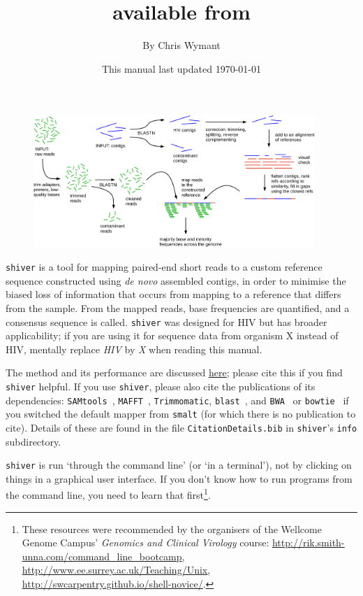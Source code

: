 \documentclass{article}
\title{\shiv\\available from \href{https://github.com/ChrisHIV/shiver}{\www{https://github.com/ChrisHIV/shiver}}}
\date{This manual last updated \today}
\author{By Chris Wymant}
\newcommand{\shiv}{\c{shiver}\xspace}
\let\c\texttt
\newcommand{\www}{\color{blue} \underline}
\begin{document}
\maketitle


\begin{figure}[!h]
\centering
\includegraphics[width=0.95\textwidth]{AssemblyPipelineDiagram_ForPaper.pdf}
\end{figure}


\shiv is a tool for mapping paired-end short reads to a custom reference sequence constructed using {\it de novo} assembled contigs, in order to minimise the biased loss of information that occurs from mapping to a reference that differs from the sample.
From the mapped reads, base frequencies are quantified, and a consensus sequence is called.
\shiv was designed for HIV but has broader applicability; if you are using it for sequence data from organism X instead of HIV, mentally replace {\it HIV} by {\it X} when reading this manual.

The method and its performance are discussed \href{https://doi.org/10.1093/ve/vey007}{\www{here}}; please cite this if you find \shiv helpful.
If you use \shiv, please also cite the publications of its dependencies: \c{SAMtools}~\cite{Li08062009}, \c{MAFFT}~\cite{Katoh15072002}, \c{Trimmomatic}\cite{Bolger01082014}, \c{blast}~\cite{ALTSCHUL1990403}, and \c{BWA}~\cite{doi:10.1093/bioinformatics/btp698} or \c{bowtie}~\cite{Langmead2009} if you switched the default mapper from \c{smalt} (for which there is no publication to cite).
Details of these are found in the file \c{CitationDetails.bib} in \shiv's \c{info} subdirectory.

\shiv is run `through the command line' (or `in a terminal'), not by clicking on things in a graphical user interface.
If you don't know how to run programs from the command line, you need to learn that first\footnote{These resources were recommended by the organisers of the Wellcome Genome Campus' {\it Genomics and Clinical Virology} course: \href{http://rik.smith-unna.com/command_line_bootcamp}{\www{http://rik.smith-unna.com/command\_line\_bootcamp}},\\
\href{http://www.ee.surrey.ac.uk/Teaching/Unix}{\www{http://www.ee.surrey.ac.uk/Teaching/Unix}},\\
\href{http://swcarpentry.github.io/shell-novice/}{\www{http://swcarpentry.github.io/shell-novice/}}.}.
\end{document}
